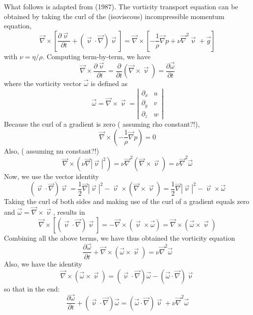 What follows is adapted from \textcite{glte87} (1987).
The vorticity transport equation can be obtained by taking the curl of the
(isoviscous) incompressible momentum equation,
\begin{equation}
\vec\nabla \times \left[ 
\frac{\partial \vec\upnu}{\partial t} + (\vec\upnu\cdot\vec\nabla) \vec\upnu \right] 
=
\vec\nabla \times \left[ - \frac{1}{\rho}\vec\nabla p +  \nu \vec\nabla^2 \vec\upnu + \vec{g}\right] 
\label{eq:sf01}
\end{equation}
with $\nu = \eta/\rho$.
Computing term-by-term, we have
\[
\vec\nabla \times 
\frac{\partial \vec\upnu}{\partial t}
=
\frac{\partial }{\partial t} (\vec\nabla \times \vec\upnu) = \frac{\partial \vec\omega}{\partial t}
\]
where the vorticity vector $\vec\omega$ is defined as
\begin{equation}
\vec\omega = \vec\nabla \times \vec\upnu 
=\left|
\begin{array}{cc}
\partial_x & u \\
\partial_y & v \\
\partial_z & w
\end{array}
\right|
\label{eq:sf04}
\end{equation}
Because the curl of a gradient is zero ({\color{orange} assuming rho constant?!}),
\[
\vec\nabla \times \left( - \frac{1}{\rho}\vec\nabla p \right) =0
\]
Also, ({\color{orange} assuming nu constant?!})
\[
\vec\nabla \times ( \nu \vec\nabla |\vec\upnu|^2 ) = \nu \vec\nabla^2 ( \vec\nabla \times \vec\upnu) = \nu  \vec\nabla^2 \vec\omega
\]
Now, we use the vector identity
\begin{equation}
(\vec\upnu\cdot\vec\nabla) \vec\upnu 
= \frac12 \vec\nabla |\vec\upnu|^2 - \vec\upnu \times (\vec\nabla \times \vec\upnu)
= \frac12 \vec\nabla |\vec\upnu|^2 - \vec\upnu \times \vec\omega
\label{eq:sf02}
\end{equation}
Taking the curl of both sides and making use of the curl of a gradient equals zero and $\vec\omega = \vec\nabla \times \vec\upnu$, results in
\[
\vec\nabla \times [ (\vec\upnu \cdot \vec\nabla ) \vec\upnu]
=-\vec\nabla \times (\vec\upnu \times \vec\omega)
=\vec\nabla \times (\vec\omega \times \vec\upnu)
\]
Combining all the above terms, we have thus obtained the vorticity equation 
\begin{equation}
\boxed{
\frac{\partial \vec\omega}{\partial t}
+ \vec\nabla \times  (\vec \omega  \times \vec\upnu) 
=\nu \vec\nabla^2 \vec\omega}
\label{eq:sf03}
\end{equation}
Also, we have the identity
\[
\vec\nabla \times (\vec\omega \times \vec\upnu) 
=
(\vec\upnu\cdot\vec\nabla)\vec\omega-(\vec\omega\cdot\vec\nabla)\vec\upnu
\]
so that in the end:
\begin{equation}
\boxed{
\frac{\partial \vec\omega}{\partial t}
+ (\vec\upnu  \cdot \vec\nabla) \vec\omega
=
(\vec\omega\cdot\vec\nabla ) \vec\upnu + \nu \vec\nabla^2 \vec\omega}
\label{eq:sf03b}
\end{equation}


